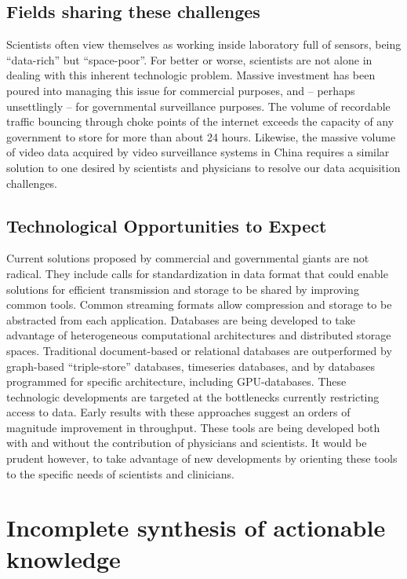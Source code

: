 \documentclass[../main.tex]{subfiles}
\begin{document}
\subsection{Fields sharing these challenges}
\label{sec:fields-sharing-this-challenges}

Scientists often view themselves as working inside laboratory full of sensors, being “data-rich” but “space-poor”.
For better or worse, scientists are not alone in dealing with this inherent technologic problem.
Massive investment has been poured into managing this issue for commercial purposes, and – perhaps unsettlingly – for governmental surveillance purposes.
The volume of recordable traffic bouncing through choke points of the internet exceeds the capacity of any government to store for more than about 24 hours.
Likewise, the massive volume of video data acquired by video surveillance systems in China requires a similar solution to one desired by scientists and physicians to resolve our data acquisition challenges.

\subsection{Technological Opportunities to Expect}
\label{sec:technological-opportunities-to-expect}

Current solutions proposed by commercial and governmental giants are not radical.
They include calls for standardization in data format that could enable solutions for efficient transmission and storage to be shared by improving common tools.
Common streaming formats allow compression and storage to be abstracted from each application.
Databases are being developed to take advantage of heterogeneous computational architectures and distributed storage spaces.
Traditional document-based or relational databases are outperformed by graph-based “triple-store” databases, timeseries databases, and by databases programmed for specific architecture, including GPU-databases.
These technologic developments are targeted at the bottlenecks currently restricting access to data.
Early results with these approaches suggest an orders of magnitude improvement in throughput.
These tools are being developed both with and without the contribution of physicians and scientists.
It would be prudent however, to take advantage of new developments by orienting these tools to the specific needs of scientists and clinicians.


\section{Incomplete synthesis of actionable knowledge}\label{incomplete-synthesis-of-actionable-knowledge}
\end{document}
